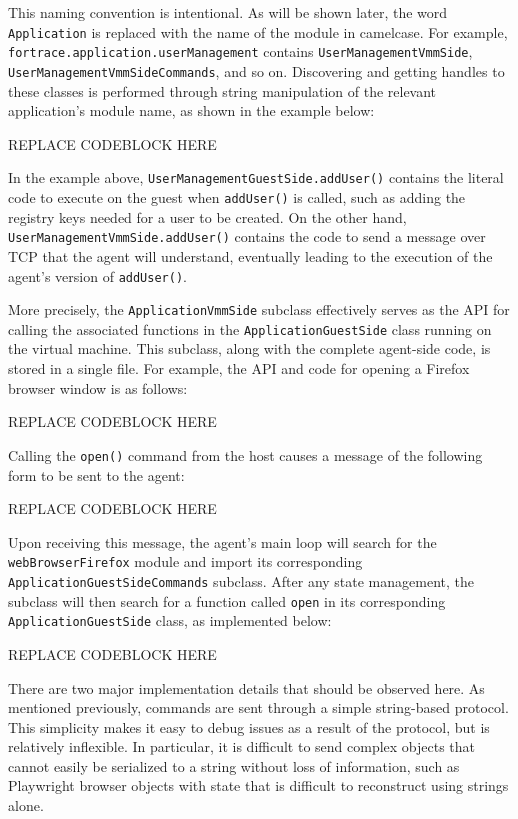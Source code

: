 \documentclass[letterpaper,12pt]{report}
\begin{document}
This naming convention is intentional. As will be shown later, the word
\texttt{Application} is replaced with the name of the module in
camelcase. For example, \texttt{fortrace.application.userManagement}
contains \texttt{UserManagementVmmSide},
\texttt{UserManagementVmmSideCommands}, and so on. Discovering and
getting handles to these classes is performed through string
manipulation of the relevant application's module name, as shown in the
example below:

REPLACE CODEBLOCK HERE

In the example above, \texttt{UserManagementGuestSide.addUser()}
contains the literal code to execute on the guest when
\texttt{addUser()} is called, such as adding the registry keys needed
for a user to be created. On the other hand,
\texttt{UserManagementVmmSide.addUser()} contains the code to send a
message over TCP that the agent will understand, eventually leading to
the execution of the agent's version of \texttt{addUser()}.

More precisely, the \texttt{ApplicationVmmSide} subclass effectively
serves as the API for calling the associated functions in the
\texttt{ApplicationGuestSide} class running on the virtual machine. This
subclass, along with the complete agent-side code, is stored in a single
file. For example, the API and code for opening a Firefox browser window
is as follows:

REPLACE CODEBLOCK HERE

Calling the \texttt{open()} command from the host causes a message of
the following form to be sent to the agent:

REPLACE CODEBLOCK HERE

Upon receiving this message, the agent's main loop will search for the
\texttt{webBrowserFirefox} module and import its corresponding
\texttt{ApplicationGuestSideCommands} subclass. After any state
management, the subclass will then search for a function called
\texttt{open} in its corresponding \texttt{ApplicationGuestSide} class,
as implemented below:

REPLACE CODEBLOCK HERE

There are two major implementation details that should be observed here.
As mentioned previously, commands are sent through a simple string-based
protocol. This simplicity makes it easy to debug issues as a result of
the protocol, but is relatively inflexible. In particular, it is
difficult to send complex objects that cannot easily be serialized to a
string without loss of information, such as Playwright browser objects
with state that is difficult to reconstruct using strings alone.
\end{document}
